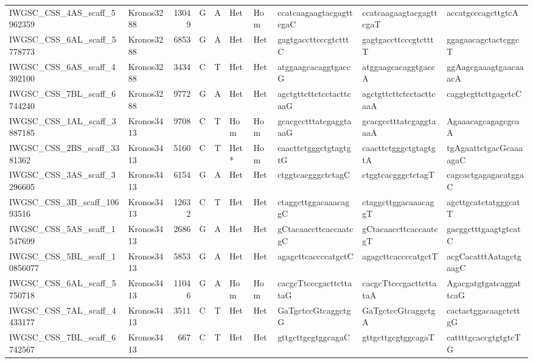 \begin{tabular}{llrlllllll}
 IWGSC\_CSS\_4AS\_scaff\_5962359  & Kronos3288 & 13049 & G    & A     & Het    & Hom   & ccatcaagaagtacgagttcgaC  & ccatcaagaagtacgagttcgaT  & accatgcccagcttgtcA       \\
 IWGSC\_CSS\_6AL\_scaff\_5778773  & Kronos3288 &  6853 & G    & A     & Het    & Het   & gagtgaccttcccgtctttC     & gagtgaccttcccgtctttT     & ggagaacagctactcggcT      \\
 IWGSC\_CSS\_6AS\_scaff\_4392100  & Kronos3288 &  3434 & C    & T     & Het    & Het   & atggaagcacaggtgaccG      & atggaagcacaggtgaccA      & ggAagcgaaagtgaacaaacA    \\
 IWGSC\_CSS\_7BL\_scaff\_6744240  & Kronos3288 &  9772 & G    & A     & Het    & Het   & agctgttcttctcctacttcaaG  & agctgttcttctcctacttcaaA  & caggtcgttcttgagctcC      \\
 IWGSC\_CSS\_1AL\_scaff\_3887185  & Kronos3413 &  9708 & C    & T     & Hom    & Hom   & gcacgcctttatcgaggtaaaG   & gcacgcctttatcgaggtaaaA   & AgaaacagcagagcgcaA       \\
 IWGSC\_CSS\_2BS\_scaff\_3381362  & Kronos3413 &  5160 & C    & T     & Het*   & Hom   & caacttctgggctgtagtgtG    & caacttctgggctgtagtgtA    & tgAgaattctgacGcaaaagaC   \\
 IWGSC\_CSS\_3AS\_scaff\_3296605  & Kronos3413 &  6154 & G    & A     & Het    & Het   & ctggtcacgggctctagC       & ctggtcacgggctctagT       & cagcactgagagacatggaC     \\
 IWGSC\_CSS\_3B\_scaff\_10693516  & Kronos3413 & 12632 & C    & T     & Het    & Het   & ctaggcttggacaaacaggC     & ctaggcttggacaaacaggT     & agcttgcatctatgggcatT     \\
 IWGSC\_CSS\_5AS\_scaff\_1547699  & Kronos3413 &  2686 & G    & A     & Het    & Het   & gCtacaaccttcaccaatcgC    & gCtacaaccttcaccaatcgT    & gacggctttgaagtgtcatC     \\
 IWGSC\_CSS\_5BL\_scaff\_10856077 & Kronos3413 &  5853 & G    & A     & Het    & Het   & agagcttcaccccatgctC      & agagcttcaccccatgctT      & acgCacatttAatagctgaagC   \\
 IWGSC\_CSS\_6AL\_scaff\_5750718  & Kronos3413 & 11046 & G    & A     & Hom    & Hom   & cacgcTtcccgacttcttataG   & cacgcTtcccgacttcttataA   & AgacgatgtgatcaggattcaG   \\
 IWGSC\_CSS\_7AL\_scaff\_4433177  & Kronos3413 &  3511 & C    & T     & Het    & Het   & GaTgctccGtcaggctgG       & GaTgctccGtcaggctgA       & cactactggacaagctcttgG    \\
 IWGSC\_CSS\_7BL\_scaff\_6742567  & Kronos3413 &   667 & C    & T     & Het    & Het   & gttgcttgcgtggcagaC       & gttgcttgcgtggcagaT       & cattttgcaccgtgtgtcTG     \\

\end{tabular}

